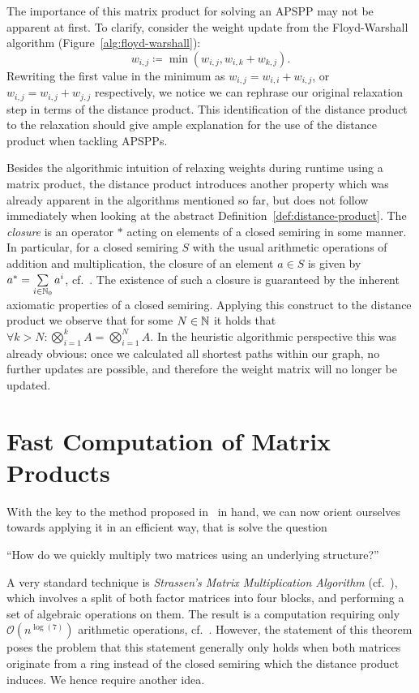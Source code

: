 The importance of this matrix product for solving an APSPP may not be apparent at first.
To clarify, consider the weight update from the Floyd-Warshall algorithm (Figure~\ref{alg:floyd-warshall}):
\[
    w_{i, j} \coloneqq \min(w_{i, j}, w_{i, k} + w_{k, j}).
\]
Rewriting the first value in the minimum as $w_{i, j} = w_{i, i} + w_{i, j}$, or $w_{i, j} = w_{i, j} + w_{j, j}$ respectively, we notice we can rephrase our original relaxation step in terms of the distance product.
This identification of the distance product to the relaxation should give ample explanation for the use of the distance product when tackling APSPPs.

Besides the algorithmic intuition of relaxing weights during runtime using a matrix product, the distance product introduces another property which was already apparent in the algorithms mentioned so far, but does not follow immediately when looking at the abstract Definition~\ref{def:distance-product}.
The \emph{closure} is an operator $*$ acting on elements of a closed semiring in some manner.
In particular, for a closed semiring $S$ with the usual arithmetic operations of addition and multiplication, the closure of an element $a \in S$ is given by $a^* = \sum\limits_{i \in \mathbb{N}_{0}} a^i$, cf.~\cite[Section~5.6]{Aho1974}.
The existence of such a closure is guaranteed by the inherent axiomatic properties of a closed semiring.
Applying this construct to the distance product we observe that for some $N \in \mathbb{N}$ it holds that $\forall k > N: \bigotimes\limits_{i = 1}^k A = \bigotimes\limits_{i = 1}^N A$.
In the heuristic algorithmic perspective this was already obvious: once we calculated all shortest paths within our graph, no further updates are possible, and therefore the weight matrix will no longer be updated.

\section{Fast Computation of Matrix Products}\label{sec:fast-matrix-products}

With the key to the method proposed in~\cite{Chan2007} in hand, we can now orient ourselves towards applying it in an efficient way, that is solve the question
\begin{displayquote}
    ``How do we quickly multiply two matrices using an underlying structure?''
\end{displayquote}
A very standard technique is \emph{Strassen's Matrix Multiplication Algorithm} (cf.~\cite[Section~6.2]{Aho1974}), which involves a split of both factor matrices into four blocks, and performing a set of algebraic operations on them.
The result is a computation requiring only $\mathcal{O}\left( n^{\log(7)} \right)$ arithmetic operations, cf.~\cite[Theorem~6.1]{Aho1974}.
However, the statement of this theorem poses the problem that this statement generally only holds when both matrices originate from a ring instead of the closed semiring which the distance product induces.
We hence require another idea.

